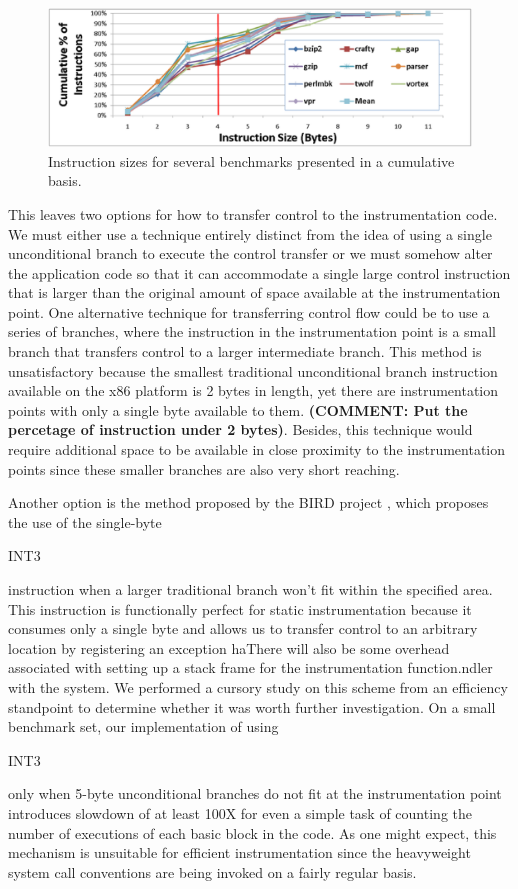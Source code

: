 \begin{figure}[ht]
\centering
\label{Figure:InstructionSizes}
\includegraphics[scale=0.5]{instsize.eps}
\caption{Instruction sizes for several benchmarks presented in a cumulative basis.}
\end{figure}

This leaves two options for how to transfer control to the instrumentation code.
We must either use a technique entirely distinct from the idea of using a single
unconditional branch to execute the control transfer or we must somehow alter the application code so
that it can accommodate a single large control instruction that is larger than
the original amount of space available at the instrumentation point. One alternative
technique for transferring control flow could be to use a series of branches,
where the instruction in the instrumentation point is a small branch that
transfers control to a larger intermediate branch. This
method is unsatisfactory because the smallest traditional unconditional branch instruction available
on the x86 platform is 2 bytes in length, yet there are
instrumentation points with only a single byte available to them. \textbf{(COMMENT: Put the percetage of instruction under 2 bytes)}.
Besides, this technique would
require additional space to be available in close proximity to the instrumentation points since these
smaller branches are also very short reaching. 

Another option is the method proposed by the BIRD project \cite{nanda2006bird}, which
proposes the use of the single-byte \begin{it}INT3\end{it} instruction when a larger traditional
branch won't fit within the specified area. This instruction is functionally
perfect for static instrumentation because it consumes only a single byte and
allows us to transfer control to an arbitrary location by registering an
exception haThere will also be some overhead
associated with setting up a stack frame for the instrumentation function.ndler with the system. We performed a cursory study on this scheme
from an efficiency standpoint to determine whether it was worth further
investigation. On a small benchmark set, our implementation of using
\begin{it}INT3\end{it} only when 5-byte unconditional branches do not fit at
the instrumentation point introduces slowdown of at least 100X for
even a simple task of counting the number of executions of each basic block in the code. As one might
expect, this mechanism is unsuitable for efficient instrumentation since the
 heavyweight system call conventions are being invoked on a fairly regular basis.

